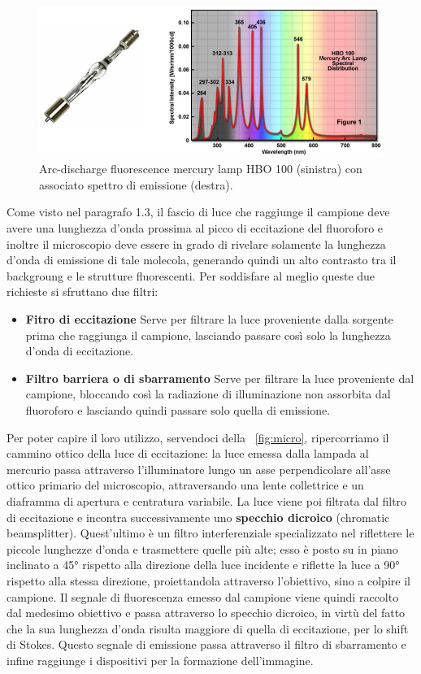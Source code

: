 \begin{figure}
 \centering
 \includegraphics[scale=.40]{img/CAP2lampadaquarzo.png}
 \caption{\small{Arc-discharge fluorescence mercury lamp HBO 100 (sinistra) con associato spettro di emissione (destra).}}
 \label{fig:lamp}
\end{figure}

Come visto nel paragrafo 1.3, il fascio di luce che raggiunge il campione deve avere una lunghezza d'onda prossima al picco di eccitazione del fluoroforo e inoltre il microscopio deve essere in grado di rivelare solamente la lunghezza d'onda di emissione di tale molecola, generando quindi un alto contrasto tra il backgroung e le strutture fluorescenti.
Per soddisfare al meglio queste due richieste si sfruttano due filtri:

\begin{itemize}
\item \textbf{Fitro di eccitazione}
Serve per filtrare la luce proveniente dalla sorgente prima che raggiunga il campione, lasciando passare così solo la lunghezza d'onda di eccitazione.

\item \textbf{Filtro barriera o di sbarramento}
Serve per filtrare la luce proveniente dal campione, bloccando così la radiazione di illuminazione non assorbita dal fluoroforo e lasciando quindi passare solo quella di emissione. 
\end{itemize}

Per poter capire il loro utilizzo, servendoci della \figurename~\ref{fig:micro}, ripercorriamo il cammino ottico della luce di eccitazione: la luce emessa dalla lampada al mercurio passa attraverso l'illuminatore lungo un asse perpendicolare all'asse ottico primario del microscopio, attraversando una lente collettrice e un diaframma di apertura e centratura variabile. 
La luce viene poi filtrata dal filtro di eccitazione e incontra successivamente uno \textbf{specchio dicroico} (chromatic beamsplitter). 
Quest'ultimo è un filtro interferenziale specializzato nel riflettere le piccole lunghezze d'onda e trasmettere quelle più alte; esso è posto su in piano inclinato a 45° rispetto alla direzione della luce incidente e riflette la luce a 90° rispetto alla stessa direzione, proiettandola attraverso l'obiettivo, sino a colpire il campione. 
Il segnale di fluorescenza emesso dal campione viene quindi raccolto dal medesimo obiettivo e passa attraverso lo specchio dicroico, in virtù del fatto che la sua lunghezza d'onda risulta maggiore di quella di eccitazione, per lo shift di Stokes. 
Questo segnale di emissione passa attraverso il filtro di sbarramento e infine raggiunge i dispositivi per la formazione dell'immagine.

